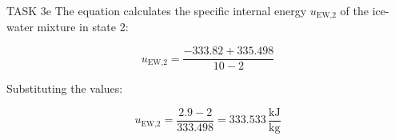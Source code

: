 TASK 3e  
The equation calculates the specific internal energy \( u_{\text{EW,2}} \) of the ice-water mixture in state 2:

\[
u_{\text{EW,2}} = \frac{-333.82 + 335.498}{10 - 2}
\]

Substituting the values:

\[
u_{\text{EW,2}} = \frac{2.9 - 2}{333.498} = 333.533 \, \frac{\text{kJ}}{\text{kg}}
\]